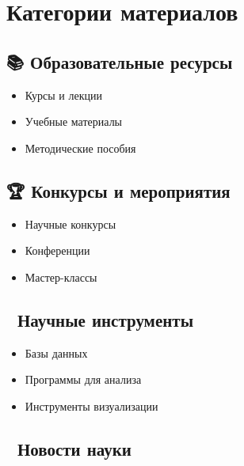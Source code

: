 \documentclass[
  russian,
  letterpaper,
]{book}
\providecommand{\tightlist}{%
  \setlength{\itemsep}{0pt}\setlength{\parskip}{0pt}}
\begin{document}
\section{Категории
материалов}\label{ux43aux430ux442ux435ux433ux43eux440ux438ux438-ux43cux430ux442ux435ux440ux438ux430ux43bux43eux432}

\subsection{📚 Образовательные
ресурсы}\label{ux43eux431ux440ux430ux437ux43eux432ux430ux442ux435ux43bux44cux43dux44bux435-ux440ux435ux441ux443ux440ux441ux44b}

\begin{itemize}
\tightlist
\item
  Курсы и лекции
\item
  Учебные материалы
\item
  Методические пособия
\end{itemize}

\subsection{🏆 Конкурсы и
мероприятия}\label{ux43aux43eux43dux43aux443ux440ux441ux44b-ux438-ux43cux435ux440ux43eux43fux440ux438ux44fux442ux438ux44f-1}

\begin{itemize}
\tightlist
\item
  Научные конкурсы
\item
  Конференции
\item
  Мастер-классы
\end{itemize}

\subsection{🔬 Научные
инструменты}\label{ux43dux430ux443ux447ux43dux44bux435-ux438ux43dux441ux442ux440ux443ux43cux435ux43dux442ux44b}

\begin{itemize}
\tightlist
\item
  Базы данных
\item
  Программы для анализа
\item
  Инструменты визуализации
\end{itemize}

\subsection{📰 Новости
науки}\label{ux43dux43eux432ux43eux441ux442ux438-ux43dux430ux443ux43aux438}
\end{document}
